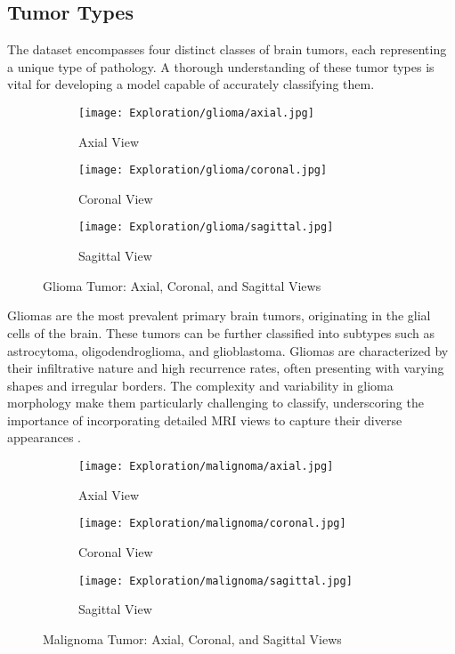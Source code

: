 \subsection{Tumor Types}\label{tumor_types}

The dataset encompasses four distinct classes of brain tumors, each representing a unique type of pathology. A thorough understanding of these tumor types is vital for developing a model capable of accurately classifying them.

\begin{figure}[H]
  \centering
  \begin{subfigure}[b]{0.2\textwidth}
    \centering
    \texttt{[image: Exploration/glioma/axial.jpg]}
    \caption{Axial View}
    \label{fig:glioma_axial}
  \end{subfigure}
  \begin{subfigure}[b]{0.2\textwidth}
    \centering
    \texttt{[image: Exploration/glioma/coronal.jpg]}
    \caption{Coronal View}
    \label{fig:glioma_coronal}
  \end{subfigure}
  \begin{subfigure}[b]{0.2\textwidth}
    \centering
    \texttt{[image: Exploration/glioma/sagittal.jpg]}
    \caption{Sagittal View}
    \label{fig:glioma_sagittal}
  \end{subfigure}
  \caption{Glioma Tumor: Axial, Coronal, and Sagittal Views}
  \label{fig:glioma_views}
\end{figure}

Gliomas are the most prevalent primary brain tumors, originating in the glial cells of the brain. These tumors can be further classified into subtypes such as astrocytoma, oligodendroglioma, and glioblastoma. Gliomas are characterized by their infiltrative nature and high recurrence rates, often presenting with varying shapes and irregular borders. The complexity and variability in glioma morphology make them particularly challenging to classify, underscoring the importance of incorporating detailed MRI views to capture their diverse appearances \cite{abd-ellah_automatic_2024}.

\begin{figure}[H]
  \centering
  \begin{subfigure}[b]{0.2\textwidth}
    \centering
    \texttt{[image: Exploration/malignoma/axial.jpg]}
    \caption{Axial View}
    \label{fig:malignoma_axial}
  \end{subfigure}
  \begin{subfigure}[b]{0.2\textwidth}
    \centering
    \texttt{[image: Exploration/malignoma/coronal.jpg]}
    \caption{Coronal View}
    \label{fig:malignoma_coronal}
  \end{subfigure}
  \begin{subfigure}[b]{0.2\textwidth}
    \centering
    \texttt{[image: Exploration/malignoma/sagittal.jpg]}
    \caption{Sagittal View}
    \label{fig:malignoma_sagittal}
  \end{subfigure}
  \caption{Malignoma Tumor: Axial, Coronal, and Sagittal Views}
  \label{fig:malignoma_views}
\end{figure}

